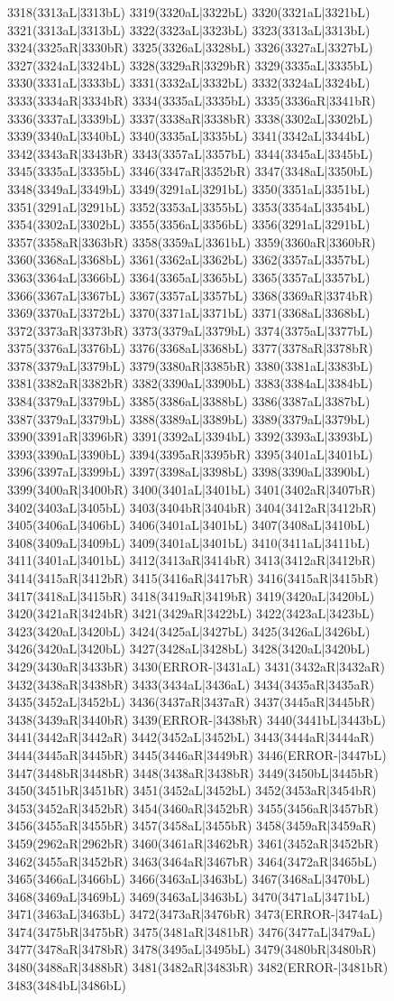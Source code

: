 3318(3313aL|3313bL) 3319(3320aL|3322bL) 3320(3321aL|3321bL) 3321(3313aL|3313bL) 3322(3323aL|3323bL) 3323(3313aL|3313bL) 3324(3325aR|3330bR) 3325(3326aL|3328bL) 3326(3327aL|3327bL) 3327(3324aL|3324bL) 3328(3329aR|3329bR) 3329(3335aL|3335bL) 3330(3331aL|3333bL) 3331(3332aL|3332bL) 3332(3324aL|3324bL) 3333(3334aR|3334bR) 3334(3335aL|3335bL) 3335(3336aR|3341bR) 3336(3337aL|3339bL) 3337(3338aR|3338bR) 3338(3302aL|3302bL) 3339(3340aL|3340bL) 3340(3335aL|3335bL) 3341(3342aL|3344bL) 3342(3343aR|3343bR) 3343(3357aL|3357bL) 3344(3345aL|3345bL) 3345(3335aL|3335bL) 3346(3347aR|3352bR) 3347(3348aL|3350bL) 3348(3349aL|3349bL) 3349(3291aL|3291bL) 3350(3351aL|3351bL) 3351(3291aL|3291bL) 3352(3353aL|3355bL) 3353(3354aL|3354bL) 3354(3302aL|3302bL) 3355(3356aL|3356bL) 3356(3291aL|3291bL) 3357(3358aR|3363bR) 3358(3359aL|3361bL) 3359(3360aR|3360bR) 3360(3368aL|3368bL) 3361(3362aL|3362bL) 3362(3357aL|3357bL) 3363(3364aL|3366bL) 3364(3365aL|3365bL) 3365(3357aL|3357bL) 3366(3367aL|3367bL) 3367(3357aL|3357bL) 3368(3369aR|3374bR) 3369(3370aL|3372bL) 3370(3371aL|3371bL) 3371(3368aL|3368bL) 3372(3373aR|3373bR) 3373(3379aL|3379bL) 3374(3375aL|3377bL) 3375(3376aL|3376bL) 3376(3368aL|3368bL) 3377(3378aR|3378bR) 3378(3379aL|3379bL) 3379(3380aR|3385bR) 3380(3381aL|3383bL) 3381(3382aR|3382bR) 3382(3390aL|3390bL) 3383(3384aL|3384bL) 3384(3379aL|3379bL) 3385(3386aL|3388bL) 3386(3387aL|3387bL) 3387(3379aL|3379bL) 3388(3389aL|3389bL) 3389(3379aL|3379bL) 3390(3391aR|3396bR) 3391(3392aL|3394bL) 3392(3393aL|3393bL) 3393(3390aL|3390bL) 3394(3395aR|3395bR) 3395(3401aL|3401bL) 3396(3397aL|3399bL) 3397(3398aL|3398bL) 3398(3390aL|3390bL) 3399(3400aR|3400bR) 3400(3401aL|3401bL) 3401(3402aR|3407bR) 3402(3403aL|3405bL) 3403(3404bR|3404bR) 3404(3412aR|3412bR) 3405(3406aL|3406bL) 3406(3401aL|3401bL) 3407(3408aL|3410bL) 3408(3409aL|3409bL) 3409(3401aL|3401bL) 3410(3411aL|3411bL) 3411(3401aL|3401bL) 3412(3413aR|3414bR) 3413(3412aR|3412bR) 3414(3415aR|3412bR) 3415(3416aR|3417bR) 3416(3415aR|3415bR) 3417(3418aL|3415bR) 3418(3419aR|3419bR) 3419(3420aL|3420bL) 3420(3421aR|3424bR) 3421(3429aR|3422bL) 3422(3423aL|3423bL) 3423(3420aL|3420bL) 3424(3425aL|3427bL) 3425(3426aL|3426bL) 3426(3420aL|3420bL) 3427(3428aL|3428bL) 3428(3420aL|3420bL) 3429(3430aR|3433bR) 3430(ERROR-|3431aL) 3431(3432aR|3432aR) 3432(3438aR|3438bR) 3433(3434aL|3436aL) 3434(3435aR|3435aR) 3435(3452aL|3452bL) 3436(3437aR|3437aR) 3437(3445aR|3445bR) 3438(3439aR|3440bR) 3439(ERROR-|3438bR) 3440(3441bL|3443bL) 3441(3442aR|3442aR) 3442(3452aL|3452bL) 3443(3444aR|3444aR) 3444(3445aR|3445bR) 3445(3446aR|3449bR) 3446(ERROR-|3447bL) 3447(3448bR|3448bR) 3448(3438aR|3438bR) 3449(3450bL|3445bR) 3450(3451bR|3451bR) 3451(3452aL|3452bL) 3452(3453aR|3454bR) 3453(3452aR|3452bR) 3454(3460aR|3452bR) 3455(3456aR|3457bR) 3456(3455aR|3455bR) 3457(3458aL|3455bR) 3458(3459aR|3459aR) 3459(2962aR|2962bR) 3460(3461aR|3462bR) 3461(3452aR|3452bR) 3462(3455aR|3452bR) 3463(3464aR|3467bR) 3464(3472aR|3465bL) 3465(3466aL|3466bL) 3466(3463aL|3463bL) 3467(3468aL|3470bL) 3468(3469aL|3469bL) 3469(3463aL|3463bL) 3470(3471aL|3471bL) 3471(3463aL|3463bL) 3472(3473aR|3476bR) 3473(ERROR-|3474aL) 3474(3475bR|3475bR) 3475(3481aR|3481bR) 3476(3477aL|3479aL) 3477(3478aR|3478bR) 3478(3495aL|3495bL) 3479(3480bR|3480bR) 3480(3488aR|3488bR) 3481(3482aR|3483bR) 3482(ERROR-|3481bR) 3483(3484bL|3486bL) 